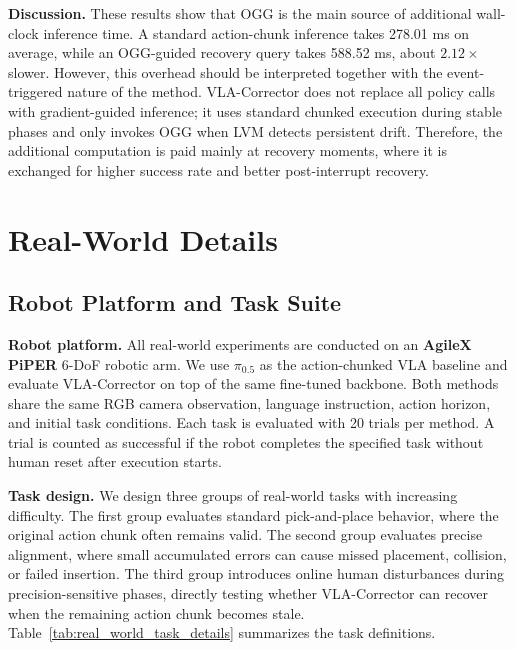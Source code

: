 \textbf{Discussion.}
These results show that OGG is the main source of additional wall-clock inference time. A standard action-chunk inference takes 278.01 ms on average, while an OGG-guided recovery query takes 588.52 ms, about $2.12\times$ slower. However, this overhead should be interpreted together with the event-triggered nature of the method. VLA-Corrector does not replace all policy calls with gradient-guided inference; it uses standard chunked execution during stable phases and only invokes OGG when LVM detects persistent drift. Therefore, the additional computation is paid mainly at recovery moments, where it is exchanged for higher success rate and better post-interrupt recovery.

\section{Real-World Details}
\label{app:real_world_details}

\subsection{Robot Platform and Task Suite}
\label{app:real_world_platform_tasks}

\textbf{Robot platform.}
All real-world experiments are conducted on an \textbf{AgileX PiPER} 6-DoF robotic arm. We use $\pi_{0.5}$ as the action-chunked VLA baseline and evaluate VLA-Corrector on top of the same fine-tuned backbone. Both methods share the same RGB camera observation, language instruction, action horizon, and initial task conditions. Each task is evaluated with 20 trials per method. A trial is counted as successful if the robot completes the specified task without human reset after execution starts.

\textbf{Task design.}
We design three groups of real-world tasks with increasing difficulty. The first group evaluates standard pick-and-place behavior, where the original action chunk often remains valid. The second group evaluates precise alignment, where small accumulated errors can cause missed placement, collision, or failed insertion. The third group introduces online human disturbances during precision-sensitive phases, directly testing whether VLA-Corrector can recover when the remaining action chunk becomes stale. Table~\ref{tab:real_world_task_details} summarizes the task definitions.

